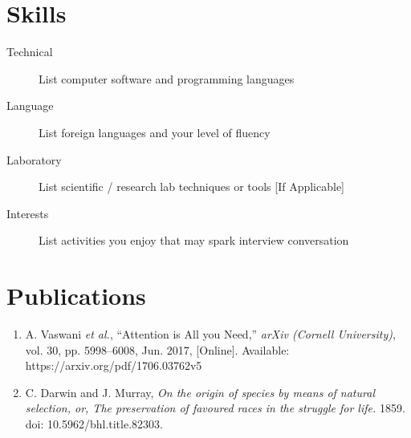 \documentclass[11pt]{article}
\begin{document}
\section{Skills}
\begin{description}
  \item[Technical] List computer software and programming languages 
  \item[Language] List foreign languages and your level of fluency
  \item[Laboratory] List scientific / research lab techniques or tools [If Applicable]
  \item[Interests] List activities you enjoy that may spark interview conversation
\end{description}


\section{Publications}
\begin{enumerate}
  \item A. Vaswani \textit{et al.}, “Attention is All you Need,” \textit{arXiv (Cornell University)}, vol. 30, pp. 5998–6008, Jun. 2017, [Online]. Available: https://arxiv.org/pdf/1706.03762v5
  \item C. Darwin and J. Murray, \textit{On the origin of species by means of natural selection, or, The preservation of favoured races in the struggle for life.} 1859. doi: 10.5962/bhl.title.82303.
\end{enumerate}
\end{document}

